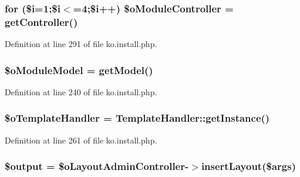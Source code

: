 \subsubsection[{\$o\+Module\+Controller}]{\setlength{\rightskip}{0pt plus 5cm}for (\$i=1;\$i$<$=4;\$i++) \$o\+Module\+Controller = {\bf get\+Controller}(\textquotesingle{})}\label{ko_8install_8php_a9fd93f6625cec4fd65bf6f412e28c015}


Definition at line 291 of file ko.\+install.\+php.

\hypertarget{ko_8install_8php_a8d7a87df524e7d6938f66f8e284cdd1e}{}
\subsubsection[{\$o\+Module\+Model}]{\setlength{\rightskip}{0pt plus 5cm}\$o\+Module\+Model = {\bf get\+Model}(\textquotesingle{})}\label{ko_8install_8php_a8d7a87df524e7d6938f66f8e284cdd1e}


Definition at line 240 of file ko.\+install.\+php.

\hypertarget{ko_8install_8php_abd57e3ab220291ea9b5c16c2a4e0670e}{}
\subsubsection[{\$o\+Template\+Handler}]{\setlength{\rightskip}{0pt plus 5cm}\$o\+Template\+Handler = {\bf Template\+Handler\+::get\+Instance}()}\label{ko_8install_8php_abd57e3ab220291ea9b5c16c2a4e0670e}


Definition at line 261 of file ko.\+install.\+php.

\hypertarget{ko_8install_8php_a73004ce9cd673c1bfafd1dc351134797}{}
\subsubsection[{\$output}]{\setlength{\rightskip}{0pt plus 5cm}\$output = \$o\+Layout\+Admin\+Controller-\/$>$insert\+Layout(\$args)}\label{ko_8install_8php_a73004ce9cd673c1bfafd1dc351134797}


